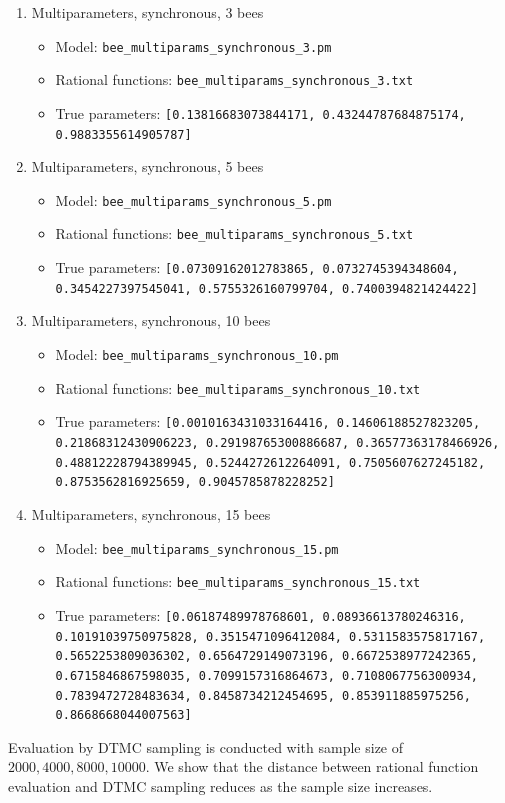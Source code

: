 \documentclass[12pt]{article}
\theoremstyle{definition}
\begin{document}
\begin{enumerate}
\item Multiparameters, synchronous, 3 bees
  \begin{itemize}
  \item Model: \texttt{bee\_multiparams\_synchronous\_3.pm}
  \item Rational functions: \texttt{bee\_multiparams\_synchronous\_3.txt}
  \item True parameters: \texttt{[0.13816683073844171, 0.43244787684875174, 0.9883355614905787]} 
  \end{itemize}
\item Multiparameters, synchronous, 5 bees
  \begin{itemize}
  \item Model: \texttt{bee\_multiparams\_synchronous\_5.pm}
  \item Rational functions: \texttt{bee\_multiparams\_synchronous\_5.txt}
  \item True parameters: \texttt{[0.07309162012783865, 0.0732745394348604,
      0.3454227397545041, 0.5755326160799704, 0.7400394821424422]}
  \end{itemize}
\item Multiparameters, synchronous, 10 bees
  \begin{itemize}
  \item Model: \texttt{bee\_multiparams\_synchronous\_10.pm}
  \item Rational functions: \texttt{bee\_multiparams\_synchronous\_10.txt}
  \item True parameters: \texttt{[0.0010163431033164416, 0.14606188527823205,
      0.21868312430906223, 0.29198765300886687, 0.36577363178466926,
      0.48812228794389945, 0.5244272612264091, 0.7505607627245182,
      0.8753562816925659, 0.9045785878228252] }
  \end{itemize}
\item Multiparameters, synchronous, 15 bees
  \begin{itemize}
  \item Model: \texttt{bee\_multiparams\_synchronous\_15.pm}
  \item Rational functions: \texttt{bee\_multiparams\_synchronous\_15.txt}
  \item True parameters: \texttt{[0.06187489978768601, 0.08936613780246316,
      0.10191039750975828, 0.3515471096412084, 0.5311583575817167,
      0.5652253809036302, 0.6564729149073196, 0.6672538977242365,
      0.6715846867598035, 0.7099157316864673, 0.7108067756300934,
      0.7839472728483634, 0.8458734212454695, 0.853911885975256,
      0.8668668044007563]}
  \end{itemize}
\end{enumerate}
Evaluation by DTMC sampling is conducted with sample size of $2000, 4000, 8000,
10000$. We show that the distance between rational function evaluation and DTMC
sampling reduces as the sample size increases.
\end{document}

